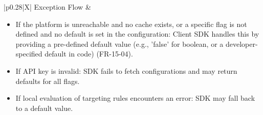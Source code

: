 \begin{minipage}{\textwidth}
\begin{tabularx}{\textwidth}{|p{0.28\textwidth}|X|}
    \hline
    Exception Flow &
        \parbox[t]{\linewidth}{%
        \begin{itemize}
            \item If the platform is unreachable and no cache exists, or a specific flag is not defined and no default is set in the configuration: Client SDK handles this by providing a pre-defined default value (e.g., 'false' for boolean, or a developer-specified default in code) (FR-15-04).
            \item If API key is invalid: SDK fails to fetch configurations and may return defaults for all flags.
            \item If local evaluation of targeting rules encounters an error: SDK may fall back to a default value.
        \end{itemize}%
        } \\
    \hline
\end{tabularx}
\end{minipage}
\bigskip

